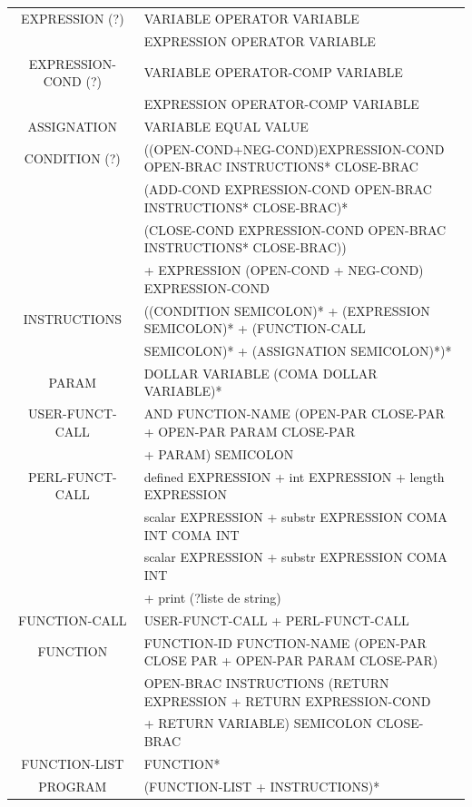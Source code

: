\documentclass[a4paper,10pt]{article}
\begin{document}
~\\





















~\\
\pagebreak
\hspace{-4.5cm}\begin{tabular}{|c|l|}
\hline
EXPRESSION (?)		& VARIABLE OPERATOR VARIABLE   \\
					& EXPRESSION OPERATOR VARIABLE \\ \hline
EXPRESSION-COND (?)	& VARIABLE OPERATOR-COMP VARIABLE   \\
					& EXPRESSION OPERATOR-COMP VARIABLE \\ \hline
ASSIGNATION			& VARIABLE EQUAL VALUE \\ \hline
CONDITION (?)		& ((OPEN-COND+NEG-COND)EXPRESSION-COND OPEN-BRAC INSTRUCTIONS* CLOSE-BRAC\\
					& (ADD-COND EXPRESSION-COND OPEN-BRAC INSTRUCTIONS* CLOSE-BRAC)* \\
					& (CLOSE-COND EXPRESSION-COND OPEN-BRAC INSTRUCTIONS* CLOSE-BRAC))\\
					& + EXPRESSION (OPEN-COND + NEG-COND) EXPRESSION-COND \\ \hline
INSTRUCTIONS		& ((CONDITION SEMICOLON)* + (EXPRESSION SEMICOLON)* + (FUNCTION-CALL \\ 
					& SEMICOLON)* + (ASSIGNATION SEMICOLON)*)* \\ \hline
PARAM				& DOLLAR VARIABLE (COMA DOLLAR VARIABLE)* \\ \hline
USER-FUNCT-CALL		& AND FUNCTION-NAME (OPEN-PAR CLOSE-PAR + OPEN-PAR PARAM CLOSE-PAR  \\
					& + PARAM) SEMICOLON \\ \hline
PERL-FUNCT-CALL		& defined EXPRESSION + int EXPRESSION + length EXPRESSION \\ 
					& scalar EXPRESSION + substr EXPRESSION COMA INT COMA INT \\
					& scalar EXPRESSION + substr EXPRESSION COMA INT  \\
					& + print (?liste de string) \\ \hline
FUNCTION-CALL		& USER-FUNCT-CALL + PERL-FUNCT-CALL \\ \hline
FUNCTION			& FUNCTION-ID FUNCTION-NAME (OPEN-PAR CLOSE PAR + OPEN-PAR PARAM CLOSE-PAR) \\
					& OPEN-BRAC INSTRUCTIONS (RETURN EXPRESSION + RETURN EXPRESSION-COND \\
					& + RETURN VARIABLE) SEMICOLON CLOSE-BRAC \\ \hline
FUNCTION-LIST		& FUNCTION* \\ \hline
PROGRAM				& (FUNCTION-LIST + INSTRUCTIONS)*\\ \hline

					
					
\end{tabular}
\end{document}
